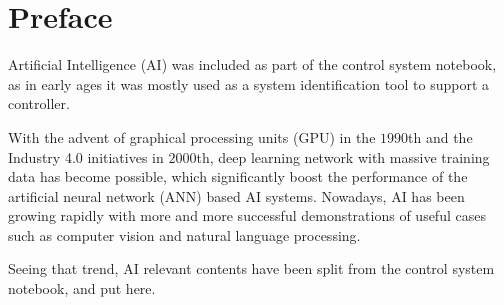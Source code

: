 \chapter*{Preface}

Artificial Intelligence (AI) was included as part of the control system notebook, as in early ages it was mostly used as a system identification tool to support a controller.

With the advent of graphical processing units (GPU) in the $1990$th and the Industry 4.0 initiatives in $2000$th, deep learning network with massive training data has become possible, which significantly boost the performance of the artificial neural network (ANN) based AI systems. Nowadays, AI has been growing rapidly with more and more successful demonstrations of useful cases such as computer vision and natural language processing.

Seeing that trend, AI relevant contents have been split from the control system notebook, and put here. 
